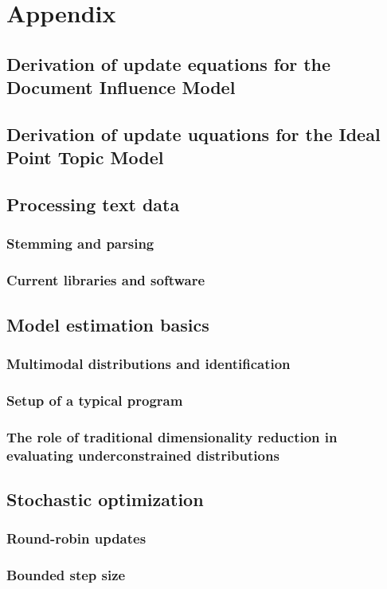 \chapter{Appendix}

\section{Derivation of update equations for the Document Influence Model}


\section{Derivation of update uquations for the Ideal Point Topic Model}


\section{Processing text data}

\subsection{Stemming and parsing}

\subsection{Current libraries and software}

\section{Model estimation basics}

\subsection{Multimodal distributions and identification}

\subsection{Setup of a typical program}

\subsection{The role of traditional dimensionality reduction in evaluating underconstrained distributions}

\section{Stochastic optimization}

\subsection{Round-robin updates}

\subsection{Bounded step size}
